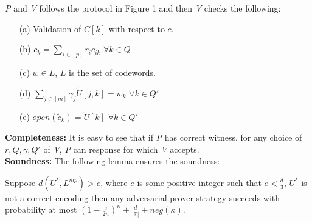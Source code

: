 \textit{P} and \textit{V} follows the protocol in Figure 1 and then
\textit{V} checks the following:
\begin{itemize}
	\item[(a)] Validation of $C[k]$ with respect to $c$.
	\item[(b)] $\tilde{c}_k = \sum\limits_{i\in[p]} r_ic_{ik}$ $\forall k\in Q$
	\item[(c)] $w\in L$, $L$ is the set of codewords.
	\item[(d)] $\sum\limits_{j\in [m]} \gamma_j \widetilde{U}[j,k] = w_k$ $\forall k\in Q'$
	\item[(e)] $open(\tilde{c}_k) = \widetilde{U}[k]$ $\forall k\in Q'$
\end{itemize}

\textbf{Completeness:} It is easy to see that if \textit{P} has correct witness, for any choice of $r, Q, \gamma, Q'$ of \textit{V}, \textit{P} can response for which \textit{V} accepts.\\

\textbf{Soundness:} The following lemma ensures the soundness:
 \begin{lemma} Suppose $d(U^*,L^{mp})>e$, where $e$ is some positive integer such that $e<\frac{d}{3}$, $U^*$ is not a correct encoding then any adversarial prover strategy succeeds with probability at most $(1-\frac{e}{2n})^{\kappa}+\frac{d}{|\mathbb{F}|}+neg(\kappa)$.
 \end{lemma}
 
